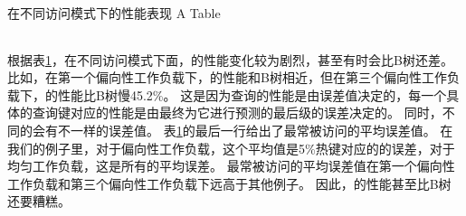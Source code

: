 \begin{table}[!hpb]
  \centering
  \bicaption[指向一个表格的表目录索引]
    {{\li}在不同访问模式下的性能表现}
    {A Table}
  \label{tab:pattern}
  \begin{tabular}{@{}llr@{}} \toprule
  \end{tabular}
\end{table}

根据表\ref{tab:pattern}，在不同访问模式下面，{\li}的性能变化较为剧烈，甚至有时会比B树还差。
比如，在第一个偏向性工作负载下，{\li}的性能和B树相近，但在第三个偏向性工作负载下，{\li}的性能比B树慢45.2\%。
这是因为查询的性能是由误差值决定的，每一个具体的查询键对应的性能是由最终为它进行预测的最后级{\model}的误差决定的。
同时，不同的{\model}会有不一样的误差值。
表\ref{tab:pattern}的最后一行给出了最常被访问{\model}的平均误差值。
在我们的例子里，对于偏向性工作负载，这个平均值是5\%热键对应的{\model}的误差，对于均匀工作负载，这是所有{\model}的平均误差。
最常被访问{\model}的平均误差值在第一个偏向性工作负载和第三个偏向性工作负载下远高于其他例子。
因此，{\li}的性能甚至比B树还要糟糕。


